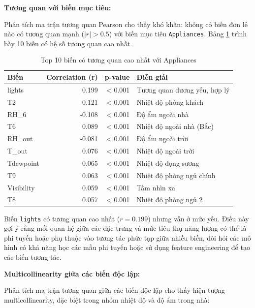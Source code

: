 \textbf{Tương quan với biến mục tiêu:}

Phân tích ma trận tương quan Pearson cho thấy khó khăn: không có biến đơn lẻ nào có tương quan mạnh ($|r| > 0.5$) với biến mục tiêu \texttt{Appliances}. Bảng \ref{tab:top_correlations} trình bày 10 biến có hệ số tương quan cao nhất.

\begin{table}[H]
\centering
\caption{Top 10 biến có tương quan cao nhất với Appliances}
\label{tab:top_correlations}
\small
\begin{tabular}{lrrp{5cm}}
\hline
\textbf{Biến} & \textbf{Correlation (r)} & \textbf{p-value} & \textbf{Diễn giải} \\
\hline
lights & 0.199 & < 0.001 & Tương quan dương yếu, hợp lý \\
T2 & 0.121 & < 0.001 & Nhiệt độ phòng khách \\
RH\_6 & -0.108 & < 0.001 & Độ ẩm ngoài nhà \\
T6 & 0.089 & < 0.001 & Nhiệt độ ngoài nhà (Bắc) \\
RH\_out & -0.081 & < 0.001 & Độ ẩm ngoài trời \\
T\_out & 0.076 & < 0.001 & Nhiệt độ ngoài trời \\
Tdewpoint & 0.065 & < 0.001 & Nhiệt độ đọng sương \\
T9 & 0.063 & < 0.001 & Nhiệt độ phòng ngủ chính \\
Visibility & 0.059 & < 0.001 & Tầm nhìn xa \\
T8 & 0.057 & < 0.001 & Nhiệt độ phòng ngủ 2 \\
\hline
\end{tabular}
\end{table}

Biến \texttt{lights} có tương quan cao nhất ($r = 0.199$) nhưng vẫn ở mức yếu. Điều này gợi ý rằng mối quan hệ giữa các đặc trưng và mức tiêu thụ năng lượng có thể là phi tuyến hoặc phụ thuộc vào tương tác phức tạp giữa nhiều biến, đòi hỏi các mô hình có khả năng học các mẫu phi tuyến hoặc sử dụng feature engineering để tạo các biến tương tác.

\textbf{Multicollinearity giữa các biến độc lập:}

Phân tích ma trận tương quan giữa các biến độc lập cho thấy hiện tượng multicollinearity, đặc biệt trong nhóm nhiệt độ và độ ẩm trong nhà:

